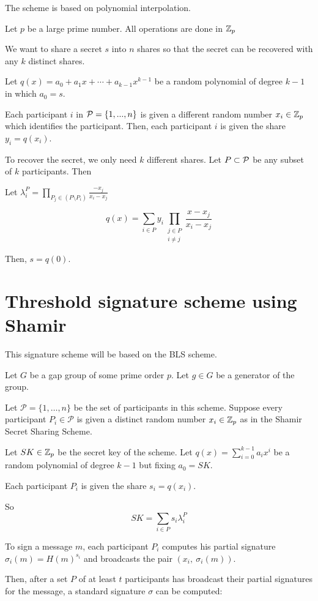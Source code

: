 The scheme is based on polynomial interpolation.

Let $p$ be a large prime number. All operations are done in ${\mathbb Z}_p$

We want to share a secret $s$ into $n$ shares so that the secret can be recovered with any $k$ distinct shares.

Let $q(x) = a_0 + a_1 x + \cdots + a_{k-1} x^{k-1}$ be a random polynomial of degree $k-1$ in which $a_0 = s$.

Each participant $i$ in ${\mathcal P} = \{ 1, ... , n \}$ is given a different random number $x_i \in {\mathbb Z}_p$ which identifies the participant.
Then, each participant $i$ is given the share $y_i = q(x_i)$.

To recover the secret, we only need $k$ different shares. Let $P \subset {\mathcal P}$ be any subset of $k$ participants. Then

Let $\lambda_i^{P} = \prod_{P_j \in (P \setminus P_i)} \frac{-x_j}{x_i - x_j}$

$$
    q(x) = \sum_{i \in P} y_i \prod_{\substack{j \in P \\ i \neq j}} \frac{x-x_j}{x_i-x_j}
$$

Then, $s = q(0)$.

\section{Threshold signature scheme using Shamir}
\label{sec:shamir_sig}

This signature scheme will be based on the BLS scheme.

Let $G$ be a gap group of some prime order $p$. Let $g \in G$ be a generator of the group.

Let $\mathcal{P}= \{ 1, \dots , n \}$ be the set of participants in this scheme. Suppose every participant $P_i \in \mathcal{P}$ is given a distinct random number $x_i \in {\mathbb Z}_p$ as in the Shamir Secret Sharing Scheme.

Let $SK \in {\mathbb Z}_p$ be the secret key of the scheme. Let $q(x) = \sum_{i=0}^{k-1} a_i x^i$ be a random polynomial of degree $k-1$ but fixing $a_0 = SK$.

Each participant $P_i$ is given the share $s_i = q(x_i)$.

So $$SK = \sum_{i \in P} s_i \lambda_i^P$$

To sign a message $m$, each participant $P_i$ computes his partial signature $\sigma_i (m) = H(m)^{s_i}$ and broadcasts the pair $(x_i, \ \sigma_i (m))$.

Then, after a set $P$ of at least $t$ participants has broadcast their partial signatures for the message, a standard signature $\sigma$ can be computed:

